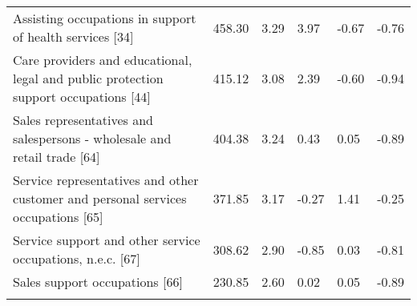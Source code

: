 \documentclass[12pt]{article}
\begin{document}
\begin{landscape}
\begin{table}[!htbp]
\begin{tabular}{p{}p{}p{}p{}p{}p{}}
Assisting occupations in support of health services [34]	& 458.30	& 3.29	& 3.97	& -0.67	& -0.76 \\
Care providers and educational, legal and public protection support occupations [44]	 & 415.12	& 3.08	& 2.39 &	-0.60 &	-0.94 \\
Sales representatives and salespersons - wholesale and retail trade [64]	& 404.38	& 3.24	& 0.43	& 0.05 &	-0.89 \\
Service representatives and other customer and personal services occupations [65]	& 371.85	& 3.17	& -0.27 &	1.41	& -0.25 \\
Service support and other service occupations, n.e.c. [67]	& 308.62	& 2.90	& -0.85	& 0.03	& -0.81 \\
Sales support occupations [66]	& 230.85	& 2.60	& 0.02	& 0.05	& -0.89 \\
\hline 
\hline \\[-1.8ex]  
\end{tabular} 
\end{table} 
\end{landscape}
\end{document}
